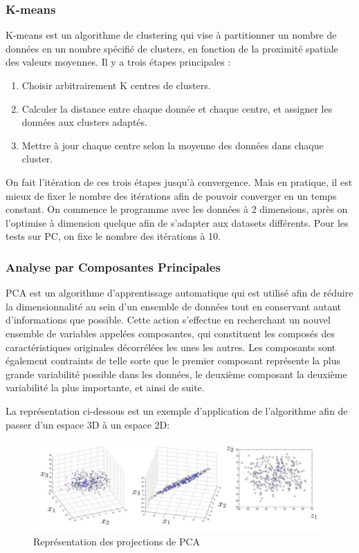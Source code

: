 \documentclass[12pt,a4paper]{article}
\begin{document}
\subsubsection{K-means}
K-means est un algorithme de clustering qui vise à partitionner un nombre de données en un nombre spécifié de clusters, en fonction de la proximité spatiale des valeurs moyennes. Il y a trois étapes principales :
\begin{enumerate}
\item Choisir arbitrairement K centres de clusters.
\item Calculer la distance entre chaque donnée et chaque centre, et assigner les données aux clusters adaptés.
\item Mettre à jour chaque centre selon la moyenne des données dans chaque cluster.
\end{enumerate}
On fait l’itération de ces trois étapes jusqu’à convergence. Mais en pratique, il est mieux de fixer le nombre des itérations afin de pouvoir converger en un temps constant. On commence le programme avec les données à 2 dimensions, après on l’optimise à dimension quelque afin de s’adapter aux datasets différents. Pour les tests sur PC, on fixe le nombre des itérations à 10.

\subsubsection{Analyse par Composantes Principales}
PCA est un algorithme d'apprentissage automatique qui est utilisé afin de réduire la dimensionnalité au sein d'un ensemble de données tout en conservant autant d'informations que possible. Cette action s'effectue en recherchant un nouvel ensemble de variables appelées composantes, qui constituent les composés des caractéristiques originales décorrélées les unes les autres. Les composants sont également contraints de telle sorte que le premier composant représente la plus grande variabilité possible dans les données, le deuxième composant la deuxième variabilité la plus importante, et ainsi de suite.

La représentation ci-dessous est un exemple d’application de l’algorithme afin de passer d’un espace 3D à un espace 2D:
\begin{figure}[H]
	\centering
	\includegraphics[width=0.8\linewidth]{soft/screenshot003}
	\caption{Représentation des projections de PCA}
	\label{fig:screenshot003}
\end{figure}
\end{document}

